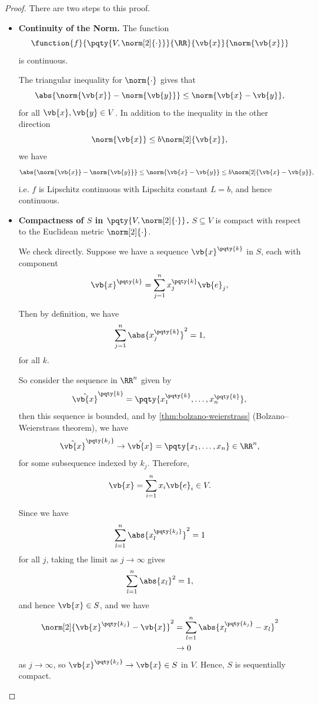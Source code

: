 \begin{proof}
    There are two steps to this proof.

    \begin{itemize}
        \item \textbf{Continuity of the Norm.} The function
        \[
            \function{f}{\pqty{V, \norm[2]{\cdot}}}{\RR}{\vb{x}}{\norm{\vb{x}}}
        \]
        is continuous.

        The triangular inequality for \(\norm{\cdot}\) gives that
        \[
            \abs{\norm{\vb{x}} - \norm{\vb{y}}} \leq \norm{\vb{x} - \vb{y}},
        \]
        for all \(\vb{x}, \vb{y} \in V\). In addition to the inequality in the other direction
        \[
            \norm{\vb{x}} \leq b \norm[2]{\vb{x}},
        \]
        we have
        \[
            \abs{\norm{\vb{x}} - \norm{\vb{y}}} \leq \norm{\vb{x} - \vb{y}} \leq b \norm[2]{\vb{x} - \vb{y}},
        \]  
        i.e. \(f\) is Lipschitz continuous with Lipschitz constant \(L = b\), and hence continuous.

        \item \textbf{Compactness of \(S\) in \(\pqty{V, \norm[2]{\cdot}}\).} \(S \subseteq V\) is compact with respect to the Euclidean metric \(\norm[2]{\cdot}\).
        
        We check directly. Suppose we have a sequence \(\vb{x}^{\pqty{k}}\) in \(S\), each with component
        \[
            \vb{x}^{\pqty{k}} = \sum_{j = 1}^{n} x_j^{\pqty{k}} \vb{e}_j,
        \]

        Then by definition, we have
        \[
            \sum_{j = 1}^{n} \abs{x_j^{\pqty{k}}}^2 = 1,
        \]
        for all \(k\).

        So consider the sequence in \(\RR^n\) given by
        \[
            \hat{\vb{x}}^{\pqty{k}} = \pqty{x_1^{\pqty{k}}, \ldots, x_n^{\pqty{k}}},
        \]
        then this sequence is bounded, and by \autoref{thm:bolzano-weierstrass} (Bolzano--Weierstrass theorem), we have
        \[
            \hat{\vb{x}}^{\pqty{k_j}} \to \hat{\vb{x}} = \pqty{x_1, \ldots, x_n} \in \RR^n,
        \]
        for some subsequence indexed by \(k_j\). Therefore,
        \[
            \vb{x} = \sum_{i = 1}^{n} x_i \vb{e}_i \in V.
        \]

        Since we have
        \[
            \sum_{l = 1}^{n} \abs{x_l^{\pqty{k_j}}}^2 = 1
        \]
        for all \(j\), taking the limit as \(j \to \infty\) gives
        \[
            \sum_{l = 1}^{n} \abs{x_l}^2 = 1,
        \]
        and hence \(\vb{x} \in S\), and we have
        \begin{align*}
            \norm[2]{\vb{x}^{\pqty{k_j}} - \vb{x}}^2 &= \sum_{l = 1}^{n} \abs{x_l^{\pqty{k_j}} - x_l}^2 \\
            &\to 0
        \end{align*}
        as \(j \to \infty\), so \(\vb{x}^{\pqty{k_j}} \to \vb{x} \in S\) in \(V\). Hence, \(S\) is sequentially compact.
    \end{itemize}


\end{proof}
